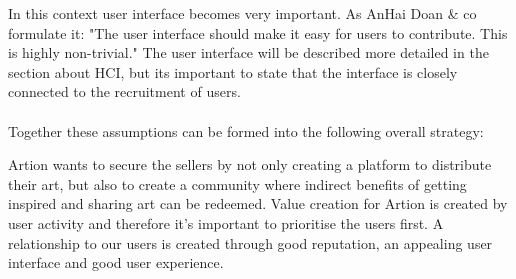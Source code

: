 In this context user interface becomes very important. As AnHai Doan & co formulate it: "The user interface should make it easy for users to contribute. This is highly non-trivial." The user interface will be described more detailed in the section about HCI, but its important to state that the interface is closely connected to the recruitment of users.
\\\\
Together these assumptions can be formed into the following overall strategy:

Artion wants to secure the sellers by not only creating a platform to distribute their art, but also to create a community where indirect benefits of getting inspired and sharing art can be redeemed. Value creation for Artion is created by user activity and therefore it’s important to prioritise the users first. A relationship to our users is created through good reputation, an appealing user interface and good user experience. 
